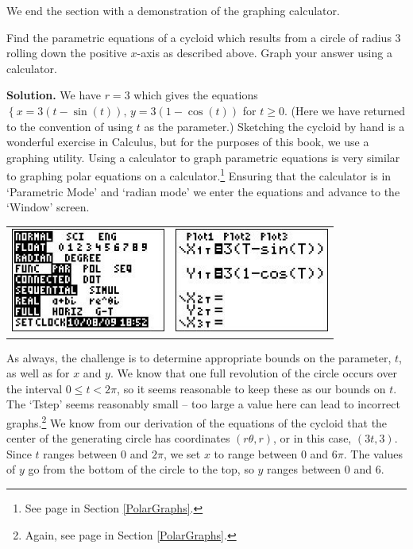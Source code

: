 We end the section with a demonstration of the graphing calculator.

\begin{ex} \label{cycloidex}  Find the parametric equations of a cycloid which results from a circle of radius $3$ rolling down the positive $x$-axis as described above.  Graph your answer using a calculator.

\smallskip

{\bf Solution.}  We have $r = 3$ which gives the equations $\left\{ x = 3(t -\sin(t)), \, y = 3(1-\cos(t)) \right.$ for $t \geq 0$.  (Here we have returned to the convention of using $t$ as the parameter.)   Sketching the cycloid by hand is a wonderful exercise in Calculus, but for the purposes of this book, we use a graphing utility.  Using a calculator to graph parametric equations is very similar to graphing polar equations on a calculator.\footnote{See page \pageref{polargraphscalculator} in Section \ref{PolarGraphs}.}  Ensuring that the calculator is in `Parametric Mode' and `radian mode' we enter the equations and advance to the `Window' screen. 

\begin{center}

\begin{tabular}{cc}

\includegraphics[width=2in]{./AppExtGraphics/Parametric01.jpg} &
\hspace{0.75in} \includegraphics[width=2in]{./AppExtGraphics/Parametric02.jpg} \\

\end{tabular} 

\end{center}

As always, the challenge is to determine appropriate bounds on the parameter, $t$, as well as for $x$ and $y$.   We know that one full revolution of the circle occurs over the interval $0 \leq t < 2\pi$, so it seems reasonable to keep these as our bounds on $t$.  The `Tstep' seems reasonably small -- too large a value here can lead to incorrect graphs.\footnote{Again, see page \pageref{polargraphscalculator} in Section \ref{PolarGraphs}.}  We know from our derivation of the equations of the cycloid that the center of the generating circle has coordinates $(r\theta,r)$, or in this case, $(3t,3)$.  Since  $t$ ranges between $0$ and $2\pi$, we set $x$ to range between $0$ and $6\pi$.  The values of $y$ go from the bottom of the circle to the top, so $y$ ranges between $0$ and $6$.


\end{ex}
